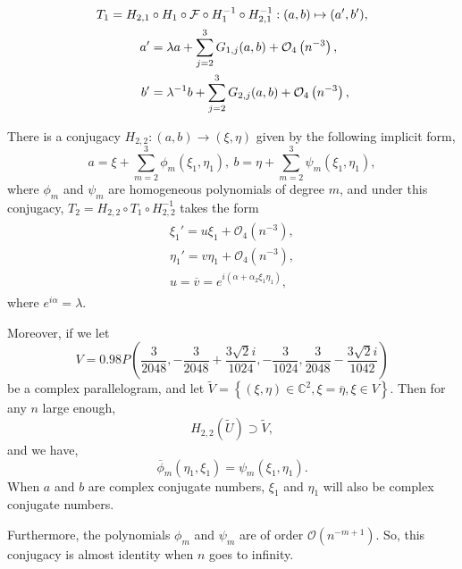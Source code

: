 \documentclass[10pt,a4paper]{amsart}
\begin{document}
	\begin{align}\label{formab}
		 T_1=H_{2,1}&\circ H_1\circ \mathcal{F} \circ H_1^{-1}\circ H_{2,1}^{-1}: (a,b)\mapsto (a',b'),\notag\\
		a'&=\lambda a + \sum_{j = 2}^{3}{G_{1,j}(a,b)}+\mathcal{O}_4\left( n^{- 3} \right),\notag\\
		b'&=\lambda^{- 1}b + \sum_{j = 2}^{3}{G_{2,j}(a,b)}+\mathcal{ O}_4\left( n^{- 3} \right),
	\end{align}

\begin{lemma}
	There is a conjugacy $H_{2,2}: (a,b)\rightarrow (\xi, \eta)$ given by the following implicit form,
	\begin{equation}\label{conj_conjugacy}
		a = \xi + \sum_{m = 2}^{3}{\phi_{m}(\xi_1,\eta_1)},\ b = \eta + \sum_{m = 2}^{3}{\psi_{m}(\xi_1,\eta_1)},
	\end{equation}
	where \(\phi_{m}\) and \(\psi_{m}\) are homogeneous polynomials of
	degree \(m\), and under this conjugacy, $T_2=H_{2,2}\circ T_1 \circ H_{2,2}^{-1} $ takes the form
	\begin{align}\label{formBirk}
		\begin{split}
			\xi_1'= u\xi_1 + \mathcal{ O}_4\left( n^{- 3} \right),\\
			\eta_1'= v\eta_1 +\mathcal{ O}_4\left( n^{- 3} \right),\\ 
			u = \overline{v} = e^{i(\alpha + \alpha_{2}\xi_1\eta_1)},
		\end{split}
	\end{align}
	where \(e^{i\alpha} = \lambda\).
	
	Moreover, if we let
	\begin{equation}\label{domain of xi}
		V=0.98P\left(	\frac{3}{2048},  -\frac{3}{2048}+\frac{3\sqrt{2}i}{1024}, -\frac{3}{1024},  \frac{3}{2048}-\frac{3\sqrt{2}i}{1042}\right)
	\end{equation}
	be a complex parallelogram, and let $\widetilde{V}=\left\{(\xi,\eta)\in \mathbb{C}^2, \xi=\overline{\eta},\xi\in V\right\}$.
	Then for any $n$ large enough,
	$$H_{2,2}\left(\widetilde{U}\right)\supset \widetilde{V},$$ and we have,
	\begin{equation}\label{complex_conj}
		{\overline{\phi}}_{m}(\eta_1,\xi_1) = \psi_{m}(\xi_1,\eta_1).
	\end{equation}
	When $a$ and $b$ are complex conjugate numbers, $\xi_1$ and $\eta_1$ will also be complex conjugate numbers.
	
	Furthermore, the polynomials $\phi_m$ and $\psi_m$ are of order $\mathcal{O}(n^{-m+1})$. So, this conjugacy is almost identity when $n$ goes to infinity.
\end{lemma}
\end{document}
